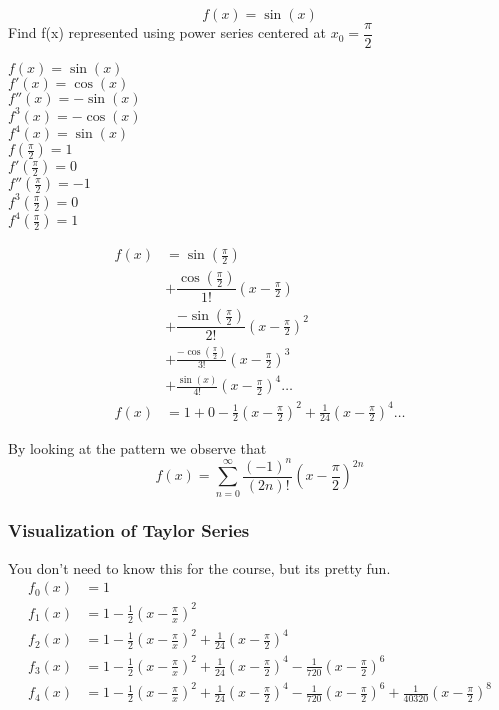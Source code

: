 	\begin{simple}{}{}
	    $$f(x)=\sin{(x)}$$
	    Find f(x) represented using power series centered at $x_0=\dfrac{\pi}{2}$
	    
	    \begin{multicols}{2}
	    \begin{center}
	        $f(x)=\sin{(x)}$\\
    	    $f'(x)=\cos{(x)}$\\
    	    $f''(x)=-\sin{(x)}$\\
    	    $f^3(x)=-\cos{(x)}$\\
    	    $f^4(x)=\sin{(x)}$\\
    	    $f(\frac{\pi}{2})=1$\\
    	    $f'(\frac{\pi}{2})=0$\\
    	    $f''(\frac{\pi}{2})=-1$\\
    	    $f^3(\frac{\pi}{2})=0$\\
    	    $f^4(\frac{\pi}{2})=1$
	    \end{center}
	    \end{multicols}
	    
	    \begin{align*}
	        f(x)&=\sin{(\frac{\pi}{2})}\\
	        &+\dfrac{\cos(\frac{\pi}{2})}{1!}\left(x-\frac{\pi}{2}\right)\\
	        &+\dfrac{-\sin{(\frac{\pi}{2})}}{2!}\left(x-\frac{\pi}{2}\right)^2\\
	        &+\frac{-\cos{(\frac{\pi}{2})}}{3!}\left(x-\frac{\pi}{2}\right)^3\\
	        &+\frac{\sin{(x)}}{4!}\left(x-\frac{\pi}{2}\right)^4 \ldots{}\\
	        f(x)&=1+0-\frac{1}{2}\left(x-\frac{\pi}{2}\right)^2+\frac{1}{24}\left(x-\frac{\pi}{2}\right)^4\ldots
	    \end{align*}
	    
	    By looking at the pattern we observe that
	    $$f(x)=\sum^\infty_{n=0}\dfrac{(-1)^n}{(2n)!}\left(x-\dfrac{\pi}{2}\right)^{2n}$$
	\end{simple}
	\subsubsection{Visualization of Taylor Series}
	You don't need to know this for the course, but its pretty fun.
	\begin{align*}
	    f_0(x)&=1\\
	    f_1(x)&=1-\frac{1}{2}\left(x-\frac{\pi}{x}\right)^2\\
	    f_2(x)&=1-\frac{1}{2}\left(x-\frac{\pi}{x}\right)^2+\frac{1}{24}\left(x-\frac{\pi}{2}\right)^4\\
	    f_3(x)&=1-\frac{1}{2}\left(x-\frac{\pi}{x}\right)^2+\frac{1}{24}\left(x-\frac{\pi}{2}\right)^4-\frac{1}{720}\left(x-\frac{\pi}{2}\right)^6\\
	    f_4(x)&=1-\frac{1}{2}\left(x-\frac{\pi}{x}\right)^2+\frac{1}{24}\left(x-\frac{\pi}{2}\right)^4-\frac{1}{720}\left(x-\frac{\pi}{2}\right)^6+\frac{1}{40320}\left(x-\frac{\pi}{2}\right)^8
	\end{align*}
	
